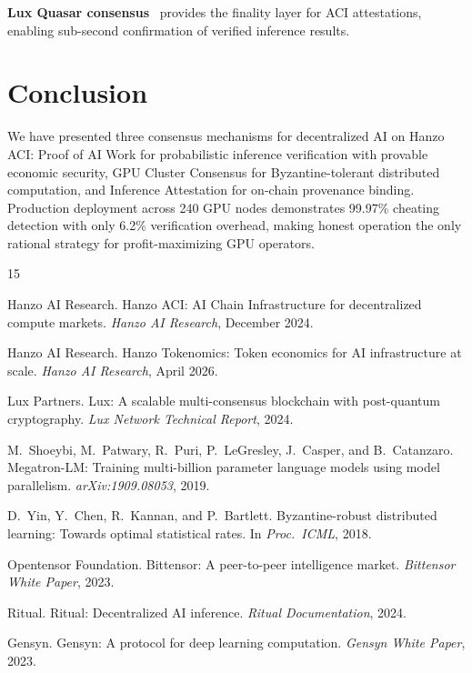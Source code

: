 \documentclass[11pt]{article}
\begin{document}
\textbf{Lux Quasar consensus}~\cite{luxwhitepaper} provides the finality layer
for ACI attestations, enabling sub-second confirmation of verified inference
results.

\section{Conclusion}
\label{sec:conclusion}

We have presented three consensus mechanisms for decentralized AI on Hanzo ACI:
Proof of AI Work for probabilistic inference verification with provable
economic security, GPU Cluster Consensus for Byzantine-tolerant distributed
computation, and Inference Attestation for on-chain provenance binding.
Production deployment across 240 GPU nodes demonstrates 99.97\% cheating
detection with only 6.2\% verification overhead, making honest operation the
only rational strategy for profit-maximizing GPU operators.

\begin{thebibliography}{15}

{Hanzo AI Research}.
\newblock Hanzo {ACI}: {AI} Chain Infrastructure for decentralized compute markets.
\newblock \emph{Hanzo AI Research}, December 2024.

{Hanzo AI Research}.
\newblock Hanzo Tokenomics: Token economics for {AI} infrastructure at scale.
\newblock \emph{Hanzo AI Research}, April 2026.

{Lux Partners}.
\newblock Lux: A scalable multi-consensus blockchain with post-quantum cryptography.
\newblock \emph{Lux Network Technical Report}, 2024.

M.~Shoeybi, M.~Patwary, R.~Puri, P.~LeGresley, J.~Casper, and B.~Catanzaro.
\newblock Megatron-{LM}: Training multi-billion parameter language models using model parallelism.
\newblock \emph{arXiv:1909.08053}, 2019.

D.~Yin, Y.~Chen, R.~Kannan, and P.~Bartlett.
\newblock Byzantine-robust distributed learning: Towards optimal statistical rates.
\newblock In \emph{Proc.\ ICML}, 2018.

{Opentensor Foundation}.
\newblock Bittensor: A peer-to-peer intelligence market.
\newblock \emph{Bittensor White Paper}, 2023.

{Ritual}.
\newblock Ritual: Decentralized {AI} inference.
\newblock \emph{Ritual Documentation}, 2024.

{Gensyn}.
\newblock Gensyn: A protocol for deep learning computation.
\newblock \emph{Gensyn White Paper}, 2023.

\end{thebibliography}
\end{document}
